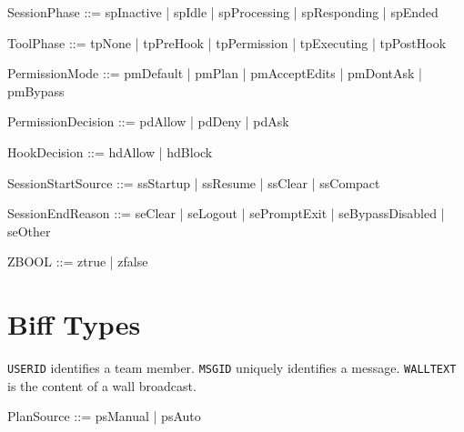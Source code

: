 \documentclass[a4paper,10pt,fleqn]{article}
\begin{document}
\begin{zed}
\end{zed}

\begin{zed}
  SessionPhase ::= spInactive | spIdle | spProcessing | spResponding | spEnded
\end{zed}

\begin{zed}
  ToolPhase ::= tpNone | tpPreHook | tpPermission | tpExecuting | tpPostHook
\end{zed}

\begin{zed}
  PermissionMode ::= pmDefault | pmPlan | pmAcceptEdits | pmDontAsk | pmBypass
\end{zed}

\begin{zed}
  PermissionDecision ::= pdAllow | pdDeny | pdAsk
\end{zed}

\begin{zed}
  HookDecision ::= hdAllow | hdBlock
\end{zed}

\begin{zed}
  SessionStartSource ::= ssStartup | ssResume | ssClear | ssCompact
\end{zed}

\begin{zed}
  SessionEndReason ::= seClear | seLogout | sePromptExit | seBypassDisabled | seOther
\end{zed}

\begin{zed}
  ZBOOL ::= ztrue | zfalse
\end{zed}

\section{Biff Types}

\begin{zed}
\end{zed}

\texttt{USERID} identifies a team member. \texttt{MSGID} uniquely
identifies a message. \texttt{WALLTEXT} is the content of a wall
broadcast.

\begin{zed}
  PlanSource ::= psManual | psAuto
\end{zed}
\end{document}
